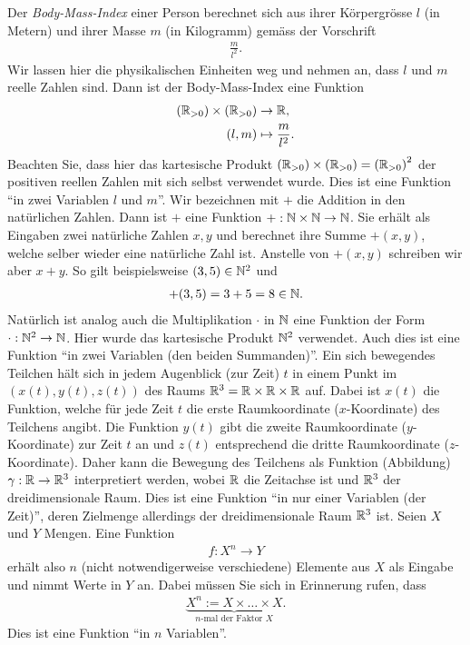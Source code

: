 \beispiele{-}{}
{Der \textit{Body-Mass-Index} einer Person berechnet sich aus ihrer Körpergrösse $l$ (in Metern) und ihrer Masse $m$ (in Kilogramm) gemäss der Vorschrift
\begin{align*}
    \frac{m}{l^2}.
\end{align*}
Wir lassen hier die physikalischen Einheiten weg und nehmen an, dass $l$ und $m$ reelle Zahlen sind. Dann ist der Body-Mass-Index eine Funktion
\begin{align*}
    \left(\mathbb{R}_{>0}\right)\times \left(\mathbb{R}_{>0}\right) &\to\mathbb{R},\\
    (l,m)&\mapsto \frac{m}{l^2}.
\end{align*}
Beachten Sie, dass hier das kartesische Produkt $\left(\mathbb{R}_{>0}\right)\times \left(\mathbb{R}_{>0}\right) = \left(\mathbb{R}_{>0}\right)^2$ der positiven reellen Zahlen mit sich selbst verwendet wurde. Dies ist eine Funktion \enquote{in zwei Variablen $l$ und $m$}.
}
{Wir bezeichnen mit $+$ die Addition in den natürlichen Zahlen. Dann ist $+$ eine Funktion $+: \mathbb{N}\times \mathbb{N} \to\mathbb{N}$. Sie erhält als Eingaben zwei natürliche Zahlen $x,y$ und berechnet ihre Summe $+(x,y)$, welche selber wieder eine natürliche Zahl ist. Anstelle von $+(x,y)$ schreiben wir aber $x + y$. So gilt beispielsweise $(3,5)\in\mathbb{N}^2$ und
\begin{align*}
    +(3,5) = 3 + 5 = 8 \in\mathbb{N}.
\end{align*}
Natürlich ist analog auch die Multiplikation $\cdot$ in $\mathbb{N}$ eine Funktion der Form $\cdot: \mathbb{N}^2\to\mathbb{N}$. Hier wurde das kartesische Produkt $\mathbb{N}^2$ verwendet. Auch dies ist eine Funktion \enquote{in zwei Variablen (den beiden Summanden)}.
}
{
Ein sich bewegendes Teilchen hält sich in jedem Augenblick (zur Zeit) $t$ in einem Punkt im $(x(t),y(t),z(t))$ des Raums $\mathbb{R}^3 = \mathbb{R}\times \mathbb{R}\times \mathbb{R}$ auf. Dabei ist $x(t)$ die Funktion, welche für jede Zeit $t$ die erste Raumkoordinate ($x$-Koordinate) des Teilchens angibt. Die Funktion $y(t)$ gibt die zweite Raumkoordinate ($y$-Koordinate) zur Zeit $t$ an und $z(t)$ entsprechend die dritte Raumkoordinate ($z$-Koordinate). Daher kann die Bewegung des Teilchens als Funktion (Abbildung) $\gamma: \mathbb{R}\to\mathbb{R}^3$ interpretiert werden, wobei $\mathbb{R}$ die Zeitachse ist und $\mathbb{R}^3$ der dreidimensionale Raum. Dies ist eine Funktion \enquote{in nur einer Variablen (der Zeit)}, deren Zielmenge allerdings der dreidimensionale Raum $\mathbb{R}^3$ ist.
}
{Seien $X$ und $Y$ Mengen. Eine Funktion
\begin{align*}
    f: X^n\to Y
\end{align*}
erhält also $n$ (nicht notwendigerweise verschiedene) Elemente aus $X$ als Eingabe und nimmt Werte in $Y$ an. Dabei müssen Sie sich in Erinnerung rufen, dass
\begin{align*}
    \underbrace{X^n := X\times \ldots \times X}_{n\text{-mal der Faktor }X}.
\end{align*}
Dies ist eine Funktion \enquote{in $n$ Variablen}.}

